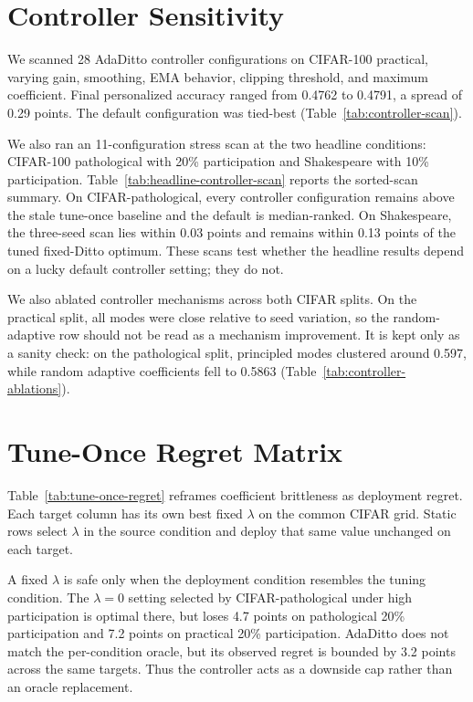 \documentclass[letterpaper]{article}
\begin{document}
\section{Controller Sensitivity}

We scanned 28 AdaDitto controller configurations on CIFAR-100 practical,
varying gain, smoothing, EMA behavior, clipping threshold, and maximum
coefficient. Final personalized accuracy ranged from 0.4762 to 0.4791,
a spread of 0.29 points. The default configuration was tied-best
(Table~\ref{tab:controller-scan}).

We also ran an 11-configuration stress scan at the two headline
conditions: CIFAR-100 pathological with 20\% participation and
Shakespeare with 10\% participation. Table~\ref{tab:headline-controller-scan}
reports the sorted-scan summary. On CIFAR-pathological, every
controller configuration remains above the stale tune-once baseline and
the default is median-ranked. On Shakespeare, the three-seed scan lies
within 0.03 points and remains within 0.13 points of the tuned
fixed-Ditto optimum. These scans test whether the headline results
depend on a lucky default controller setting; they do not.

We also ablated controller mechanisms across both CIFAR splits. On the
practical split, all modes were close relative to seed variation, so the
random-adaptive row should not be read as a mechanism improvement. It
is kept only as a sanity check: on the pathological split, principled
modes clustered around 0.597, while random adaptive coefficients fell
to 0.5863 (Table~\ref{tab:controller-ablations}).

\section{Tune-Once Regret Matrix}

Table~\ref{tab:tune-once-regret} reframes coefficient brittleness as
deployment regret. Each target column has its own best fixed $\lambda$
on the common CIFAR grid. Static rows select $\lambda$ in the source
condition and deploy that same value unchanged on each target.

A fixed $\lambda$ is safe only when the deployment condition resembles
the tuning condition. The $\lambda=0$ setting selected by
CIFAR-pathological under high participation is optimal there, but loses
4.7 points on pathological 20\% participation and 7.2 points on
practical 20\% participation. AdaDitto does not match the per-condition
oracle, but its observed regret is bounded by 3.2 points across the
same targets. Thus the controller acts as a downside cap rather than an
oracle replacement.
\end{document}
